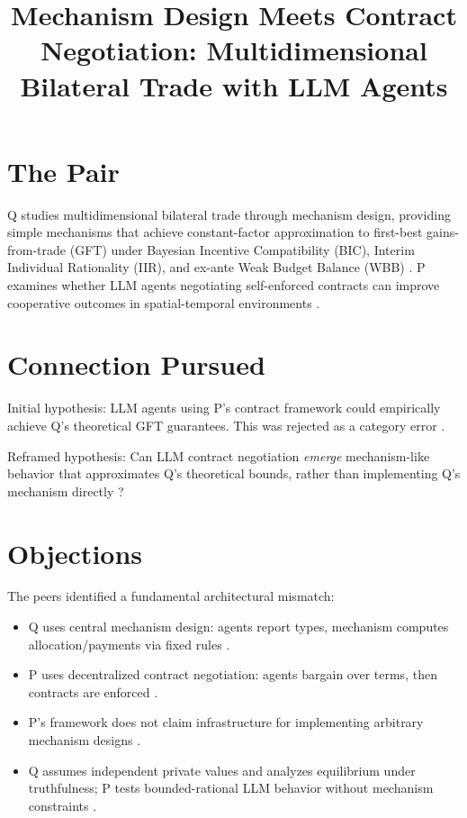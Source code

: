\documentclass{article}
\title{Mechanism Design Meets Contract Negotiation: Multidimensional Bilateral Trade with LLM Agents}
\begin{document}
\maketitle

\section*{The Pair}

Q studies multidimensional bilateral trade through mechanism design, providing simple mechanisms that achieve constant-factor approximation to first-best gains-from-trade (GFT) under Bayesian Incentive Compatibility (BIC), Interim Individual Rationality (IIR), and ex-ante Weak Budget Balance (WBB) . P examines whether LLM agents negotiating self-enforced contracts can improve cooperative outcomes in spatial-temporal environments .

\section*{Connection Pursued}

Initial hypothesis: LLM agents using P's contract framework could empirically achieve Q's theoretical GFT guarantees. This was rejected as a category error .

Reframed hypothesis: Can LLM contract negotiation \emph{emerge} mechanism-like behavior that approximates Q's theoretical bounds, rather than implementing Q's mechanism directly ?

\section*{Objections}

The peers identified a fundamental architectural mismatch:

\begin{itemize}
  \item Q uses central mechanism design: agents report types, mechanism computes allocation/payments via fixed rules .
  \item P uses decentralized contract negotiation: agents bargain over terms, then contracts are enforced .
  \item P's framework does not claim infrastructure for implementing arbitrary mechanism designs .
  \item Q assumes independent private values and analyzes equilibrium under truthfulness; P tests bounded-rational LLM behavior without mechanism constraints .
\end{itemize}
\end{document}
